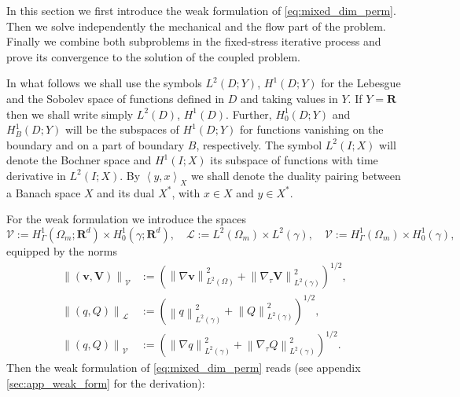 \documentclass[a4paper]{article}
\numberwithin{equation}{section}
\def\dual#1#2{\left\langle #1,#2\right\rangle}
\def\Hf{\mathscr{L}} %
\def\norm#1{\left\|#1\right\|}
\def\Real{{\mathbf R}} %
\def\V{\vc V}
\def\Vel{{\boldsymbol{\mathcal V}}} %
\def\Vf{{\mathcal V}} %
\def\vc#1{\mathbf{#1}}     %
\def\vv{\vc v}
\newcommand{\eqs}[1]{\begin{equation*}#1\end{equation*}}
\begin{document}
In this section we first introduce the weak formulation of \eqref{eq:mixed_dim_perm}.
Then we solve independently the mechanical and the flow part of the problem.
Finally we combine both subproblems in the fixed-stress iterative process and prove its convergence to the solution of the coupled problem.

In what follows we shall use the symbols $L^2(D;Y)$, $H^1(D;Y)$ for the Lebesgue and the Sobolev space of functions defined in $D$ and taking values in $Y$.
If $Y=\Real$ then we shall write simply $L^2(D)$, $H^1(D)$.
Further, $H^1_0(D;Y)$ and $H^1_B(D;Y)$ will be the subspaces of $H^1(D;Y)$ for functions vanishing on the boundary and on a part of boundary $B$, respectively.
The symbol $L^2( I;X)$ will denote the Bochner space and $H^1( I;X)$ its subspace of functions with time derivative in $L^2( I;X)$.
By $\dual{y}{x}_X$ we shall denote the duality pairing between a Banach space $X$ and its dual $X^*$, with $x\in X$ and $y\in X^*$.

For the weak formulation we introduce the spaces
\eqs{ \Vel :=H^1_\Gamma(\Omega_m;\Real^d)\times H^1_0(\gamma;\Real^d), \quad
 \Hf := L^2(\Omega_m)\times L^2(\gamma),\quad \Vf := H^1_\Gamma(\Omega_m)\times H^1_0(\gamma), }
equipped by the norms
\begin{align*}
\norm{(\vv,\V)}_\Vel &:= (\norm{\nabla\vv}_{L^2(\Omega)}^2 + \norm{\nabla_\tau\V}_{L^2(\gamma)}^2)^{1/2},\\
\norm{(q,Q)}_\Hf &:= (\norm{q}_{L^2(\gamma)}^2 + \norm{Q}_{L^2(\gamma)}^2)^{1/2},\\
\norm{(q,Q)}_\Vf &:= (\norm{\nabla q}_{L^2(\gamma)}^2 + \norm{\nabla_\tau Q}_{L^2(\gamma)}^2)^{1/2}.
\end{align*}
Then the weak formulation of \eqref{eq:mixed_dim_perm} reads (see appendix \ref{sec:app_weak_form} for the derivation):
\end{document}
